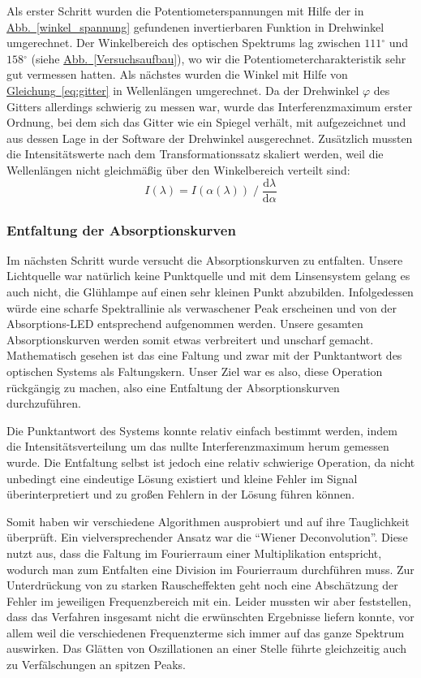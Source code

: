 \documentclass[11pt]{scrartcl}
\newcommand{\degr}{\ensuremath{^\circ}}
\newcommand{\dif}{\ensuremath{\mathrm{d}}}
\newcommand{\hypref}[2]{\hyperref[#2]{{#1}~\ref{#2}}}
\begin{document}
Als erster Schritt wurden die Potentiometerspannungen mit Hilfe der in \hypref{Abb.}{winkel_spannung} gefundenen invertierbaren Funktion in Drehwinkel umgerechnet.
Der Winkelbereich des optischen Spektrums lag zwischen $111\degr$ und $158\degr$ (siehe \hypref{Abb.}{Versuchsaufbau}), wo wir die Potentiometercharakteristik sehr gut vermessen hatten.
Als nächstes wurden die Winkel mit Hilfe von \hypref{Gleichung}{eq:gitter} in Wellenlängen umgerechnet. Da der Drehwinkel $\varphi$ des Gitters allerdings schwierig zu messen war, wurde das Interferenzmaximum erster Ordnung, bei dem sich das Gitter wie ein Spiegel verhält, mit aufgezeichnet und aus dessen Lage in der Software der Drehwinkel ausgerechnet. Zusätzlich mussten die Intensitätswerte nach dem Transformationssatz skaliert werden, weil die Wellenlängen nicht gleichmäßig über den Winkelbereich verteilt sind:
\begin{equation}
I(\lambda) = I(\alpha(\lambda)) \;/\; \frac{\dif\lambda}{\dif\alpha}
\end{equation}

\subsubsection{Entfaltung der Absorptionskurven}\label{sec:entfaltung}
Im nächsten Schritt wurde versucht die Absorptionskurven zu entfalten.
Unsere Lichtquelle war natürlich keine Punktquelle und mit dem Linsensystem gelang es auch nicht, die Glühlampe auf einen sehr kleinen Punkt abzubilden.
Infolgedessen würde eine scharfe Spektrallinie als verwaschener Peak erscheinen und von der Absorptions-LED entsprechend aufgenommen werden. Unsere gesamten Absorptionskurven werden somit etwas verbreitert und unscharf gemacht.
Mathematisch gesehen ist das eine Faltung und zwar mit der Punktantwort des optischen Systems als Faltungskern.
Unser Ziel war es also, diese Operation rückgängig zu machen, also eine Entfaltung der Absorptionskurven durchzuführen.

Die Punktantwort des Systems konnte relativ einfach bestimmt werden, indem die Intensitätsverteilung um das nullte Interferenzmaximum herum gemessen wurde.
Die Entfaltung selbst ist jedoch eine relativ schwierige Operation, da nicht unbedingt eine eindeutige Lösung existiert und kleine Fehler im Signal überinterpretiert und zu großen Fehlern in der Lösung führen können.

Somit haben wir verschiedene Algorithmen ausprobiert und auf ihre Tauglichkeit überprüft.
Ein vielversprechender Ansatz war die "`Wiener Deconvolution"'.
Diese nutzt aus, dass die Faltung im Fourierraum einer Multiplikation entspricht, wodurch man zum Entfalten eine Division im Fourierraum durchführen muss.
Zur Unterdrückung von zu starken Rauscheffekten geht noch eine Abschätzung der Fehler im jeweiligen Frequenzbereich mit ein.
Leider mussten wir aber feststellen, dass das Verfahren insgesamt nicht die erwünschten Ergebnisse liefern konnte, vor allem weil die verschiedenen Frequenzterme sich immer auf das ganze Spektrum auswirken.
Das Glätten von Oszillationen an einer Stelle führte gleichzeitig auch zu Verfälschungen an spitzen Peaks.
\end{document}
